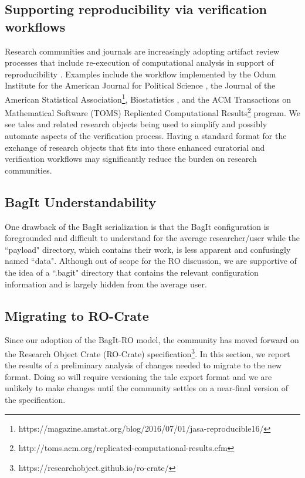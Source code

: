 \documentclass[conference]{IEEEtran}
\begin{document}
\subsection{Supporting reproducibility via verification workflows}
Research communities and journals are increasingly adopting artifact review processes that include re-execution of computational analysis in support of reproducibility \cite{stodden2013b}. Examples include the workflow implemented by the Odum Institute for the American Journal for Political Science \cite{christian2018}, the Journal of the American Statistical Association\footnote{https://magazine.amstat.org/blog/2016/07/01/jasa-reproducible16/}, Biostatistics \cite{donoho2010}, and the ACM Transactions on Mathematical Software (TOMS) Replicated Computational Results\footnote{http://toms.acm.org/replicated-computational-results.cfm} program. We see tales and related research objects being used to simplify and possibly automate aspects of the verification process. Having a standard format for the exchange of research objects that fits into these enhanced curatorial and verification workflows may significantly reduce the burden on research communities.


\subsection{BagIt Understandability}

One drawback of the BagIt serialization is that the BagIt configuration is foregrounded and 
difficult to understand for the average researcher/user while the ``payload" directory, which contains
their work, is less apparent and confusingly named ``data". Although out of scope for the RO discussion, we are 
supportive of the idea of a ``.bagit" directory that contains the relevant configuration 
information and is largely hidden from the average user.


\subsection{Migrating to RO-Crate}
Since our adoption of the BagIt-RO model, the community has moved forward on the Research Object 
Crate (RO-Crate) specification\footnote{https://researchobject.github.io/ro-crate/}. In this section, we report the results of a preliminary analysis 
of changes needed to migrate to the new format. Doing so will require versioning the tale export 
format and we are unlikely to make changes until the community settles on a near-final version of the 
specification.
\end{document}
